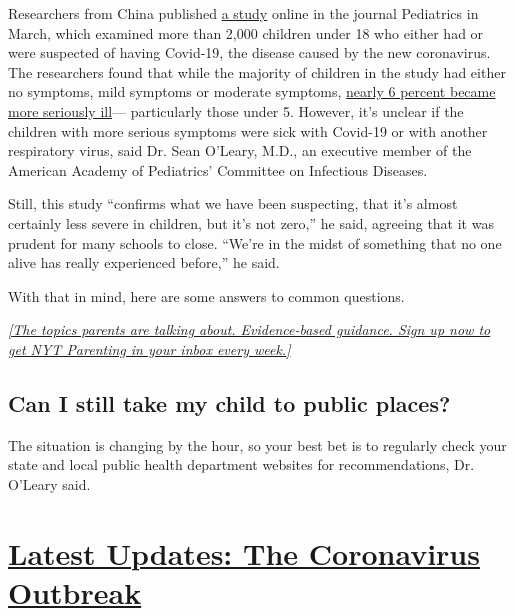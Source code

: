 Researchers from China published
\href{https://pediatrics.aappublications.org/content/pediatrics/early/2020/03/16/peds.2020-0702.full.pdf}{a
study} online in the journal Pediatrics in March, which examined more
than 2,000 children under 18 who either had or were suspected of having
Covid-19, the disease caused by the new coronavirus. The researchers
found that while the majority of children in the study had either no
symptoms, mild symptoms or moderate symptoms,
\href{https://www.nytimes3xbfgragh.onion/2020/03/17/health/coronavirus-childen.html}{nearly
6 percent became more seriously ill}--- particularly those under 5.
However, it's unclear if the children with more serious symptoms were
sick with Covid-19 or with another respiratory virus, said Dr. Sean
O'Leary, M.D., an executive member of the American Academy of
Pediatrics' Committee on Infectious Diseases.

Still, this study ``confirms what we have been suspecting, that it's
almost certainly less severe in children, but it's not zero,'' he said,
agreeing that it was prudent for many schools to close. ``We're in the
midst of something that no one alive has really experienced before,'' he
said.

With that in mind, here are some answers to common questions.

\href{https://www.nytimes3xbfgragh.onion/newsletters/parenting?module=inline}{\emph{{[}The
topics parents are talking about. Evidence-based guidance. Sign up now
to get NYT Parenting in your inbox every week.{]}}}

\hypertarget{can-i-still-take-my-child-to-public-places}{%
\subsection{Can I still take my child to public
places?}\label{can-i-still-take-my-child-to-public-places}}

The situation is changing by the hour, so your best bet is to regularly
check your state and local public health department websites for
recommendations, Dr. O'Leary said.

\hypertarget{latest-updates-the-coronavirus-outbreak}{%
\section{\texorpdfstring{\href{https://www.nytimes3xbfgragh.onion/2020/09/04/world/covid-19-coronavirus.html?action=click\&pgtype=Article\&state=default\&region=MAIN_CONTENT_1\&context=storylines_live_updates}{Latest
Updates: The Coronavirus
Outbreak}}{Latest Updates: The Coronavirus Outbreak}}\label{latest-updates-the-coronavirus-outbreak}}

